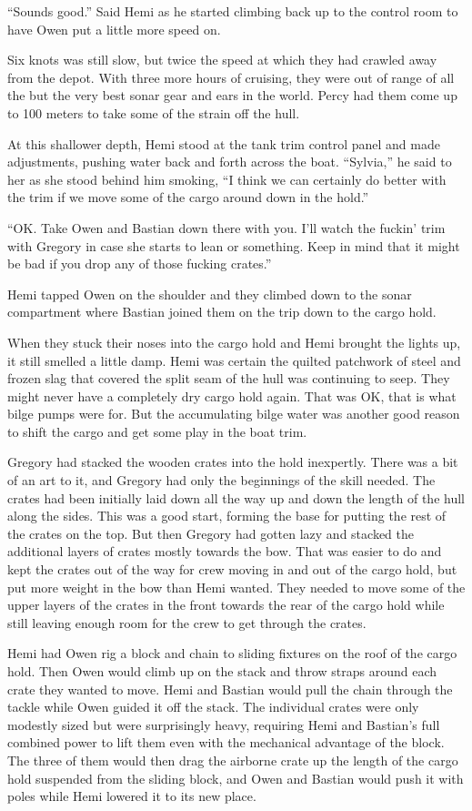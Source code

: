 \documentclass[]{scrbook}
\begin{document}
``Sounds good.'' Said Hemi as he started climbing back up to the control
room to have Owen put a little more speed on.

Six knots was still slow, but twice the speed at which they had crawled
away from the depot. With three more hours of cruising, they were out of
range of all the but the very best sonar gear and ears in the world.
Percy had them come up to 100 meters to take some of the strain off the
hull.

At this shallower depth, Hemi stood at the tank trim control panel and
made adjustments, pushing water back and forth across the boat.
``Sylvia,'' he said to her as she stood behind him smoking, ``I think we
can certainly do better with the trim if we move some of the cargo
around down in the hold.''

``OK. Take Owen and Bastian down there with you. I'll watch the fuckin'
trim with Gregory in case she starts to lean or something. Keep in mind
that it might be bad if you drop any of those fucking crates.''

Hemi tapped Owen on the shoulder and they climbed down to the sonar
compartment where Bastian joined them on the trip down to the cargo
hold.

When they stuck their noses into the cargo hold and Hemi brought the
lights up, it still smelled a little damp. Hemi was certain the quilted
patchwork of steel and frozen slag that covered the split seam of the
hull was continuing to seep. They might never have a completely dry
cargo hold again. That was OK, that is what bilge pumps were for. But
the accumulating bilge water was another good reason to shift the cargo
and get some play in the boat trim.

Gregory had stacked the wooden crates into the hold inexpertly. There
was a bit of an art to it, and Gregory had only the beginnings of the
skill needed. The crates had been initially laid down all the way up and
down the length of the hull along the sides. This was a good start,
forming the base for putting the rest of the crates on the top. But then
Gregory had gotten lazy and stacked the additional layers of crates
mostly towards the bow. That was easier to do and kept the crates out of
the way for crew moving in and out of the cargo hold, but put more
weight in the bow than Hemi wanted. They needed to move some of the
upper layers of the crates in the front towards the rear of the cargo
hold while still leaving enough room for the crew to get through the
crates.

Hemi had Owen rig a block and chain to sliding fixtures on the roof of
the cargo hold. Then Owen would climb up on the stack and throw straps
around each crate they wanted to move. Hemi and Bastian would pull the
chain through the tackle while Owen guided it off the stack. The
individual crates were only modestly sized but were surprisingly heavy,
requiring Hemi and Bastian's full combined power to lift them even with
the mechanical advantage of the block. The three of them would then drag
the airborne crate up the length of the cargo hold suspended from the
sliding block, and Owen and Bastian would push it with poles while Hemi
lowered it to its new place.
\end{document}
